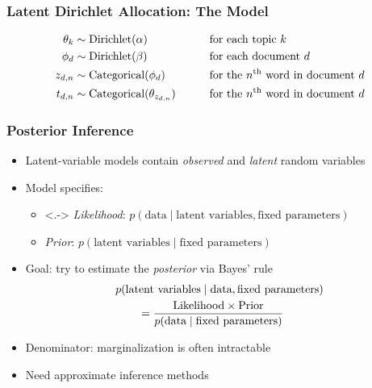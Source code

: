 \begin{frame}
\frametitle{Latent Dirichlet Allocation: The Model}
\begin{alignat*}{2}
\theta_k &\sim \text{Dirichlet}(\alpha) &\qquad&\text{for each topic $k$} \\
\phi_d &\sim \text{Dirichlet}(\beta) &\qquad&\text{for each document $d$} \\
z_{d,n} &\sim \text{Categorical}(\phi_d) &\qquad&\text{for the $n^{\text{th}}$ word in document $d$} \\
t_{d,n} &\sim \text{Categorical}(\theta_{z_{d,n}}) &\qquad&\text{for the $n^{\text{th}}$ word in document $d$}
\end{alignat*}

\begin{center}
\end{center}
\end{frame}



\begin{frame}
\frametitle{Posterior Inference}
\begin{itemize}[<+->]
\item Latent-variable models contain \emph{observed} and \emph{latent} random variables
\item Model specifies:
    \begin{itemize}
    \item<.-> \emph{Likelihood}: $p(\text{data} \mid \text{latent variables}, \text{fixed parameters})$
    \item<+-> \emph{Prior}: $p(\text{latent variables} \mid \text{fixed parameters})$
    \end{itemize}
\item Goal: try to estimate the \emph{posterior} via Bayes' rule
\begin{align*}
\MoveEqLeft
p(\text{latent variables} \mid \text{data}, \text{fixed parameters}) \\
&=
\frac{\text{Likelihood} \times \text{Prior}}
     {p(\text{data} \mid \text{fixed parameters})}
\end{align*}
\item Denominator: marginalization is often intractable
\item Need approximate inference methods
\end{itemize}
\end{frame}

